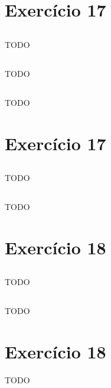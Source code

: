 \documentclass{article}
\begin{document}
\section{Exercício 17}
\subsection{}
TODO
\subsection{}
TODO
\subsection{}
TODO

\section{Exercício 17}
\subsection{}
TODO
\subsection{}
TODO

\section{Exercício 18}
\subsection{}
TODO
\subsection{}
TODO

\section{Exercício 18}
TODO
\end{document}
